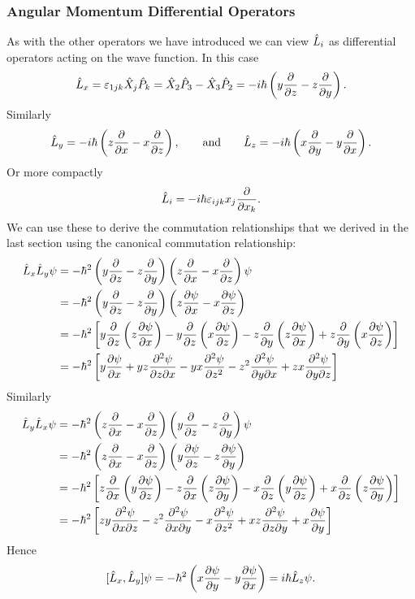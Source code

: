 \documentclass[a4paper]{article}
\theoremstyle{definition}
\begin{document}
    \subsubsection{Angular Momentum Differential Operators}
    As with the other operators we have introduced we can view \(\hat{L}_i\) as differential operators acting on the wave function.
    In this case
    \[\hat{L}_x = \varepsilon_{1jk}\hat{X}_j\hat{P}_k = \hat{X}_2\hat{P}_3 - \hat{X}_3\hat{P}_2 = -i\hbar\left(y\pdv{z} - z\pdv{y}\right).\]
    Similarly
    \[\hat{L}_y = -i\hbar\left(z\pdv{x} - x\pdv{z}\right), \qquad\text{and}\qquad \hat{L}_z = -i\hbar\left(x\pdv{y} - y\pdv{x}\right).\]
    Or more compactly
    \[\hat{L}_i = -i\hbar\varepsilon_{ijk}x_j\pdv{x_k}.\]
    We can use these to derive the commutation relationships that we derived in the last section using the canonical commutation relationship:
    \begin{align*}
        \hat{L}_x\hat{L}_y\psi &= -\hbar^2\left(y\pdv{z} - z\pdv{y}\right)\left(z\pdv{x} - x\pdv{z}\right)\psi\\
        &= -\hbar^2\left(y\pdv{z} - z\pdv{y}\right) \left(z\pdv{\psi}{x} - x\pdv{\psi}{z}\right)\\
        &= -\hbar^2\left[y\pdv{z}\left(z\pdv{\psi}{x}\right) - y\pdv{z}\left(x\pdv{\psi}{z}\right) - z\pdv{y}\left(z\pdv{\psi}{x}\right) + z\pdv{y}\left(x\pdv{\psi}{z}\right)\right]\\
        &= -\hbar^2\left[y\pdv{\psi}{x} + yz\frac{\partial^2{\psi}}{\partial{z}\partial{x}} - yx\pdv[2]{\psi}{z} - z^2\frac{\partial^2{\psi}}{\partial{y}\partial{x}} + zx\pdv{\psi}{y}{z}\right]\\
    \end{align*}
    Similarly
    \begin{align*}
        \hat{L}_y\hat{L}_x\psi &= -\hbar^2\left(z\pdv{x} - x\pdv{z}\right)\left(y\pdv{z} - z\pdv{y}\right)\psi\\
        &= -\hbar^2\left(z\pdv{x} - x\pdv{z}\right)\left(y\pdv{\psi}{z} - z\pdv{\psi}{y}\right)\\
        &= -\hbar^2\left[z\pdv{x}\left(y\pdv{\psi}{z}\right) - z\pdv{x}\left(z\pdv{\psi}{y}\right) - x\pdv{z}\left(y\pdv{\psi}{z}\right) + x\pdv{z}\left(z\pdv{\psi}{y}\right)\right]\\
        &= -\hbar^2\left[zy\frac{\partial^2{\psi}}{\partial{x}\partial{z}} - z^2\frac{\partial^2{\psi}}{\partial{x}\partial{y}} - x\pdv[2]{\psi}{z} + xz\frac{\partial^2{\psi}}{\partial{z}\partial{y}} + x\pdv{\psi}{y}\right]
    \end{align*}
    Hence
    \[[\hat{L}_x, \hat{L}_y]\psi = -\hbar^2\left(x\pdv{\psi}{y} - y\pdv{\psi}{x}\right) = i\hbar\hat{L}_z\psi.\]
    
\end{document}
